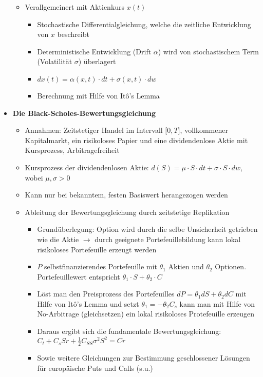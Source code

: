 \begin{itemize}
\begin{itemize}
		\item Verallgemeinert mit Aktienkurs \(x(t)\)
		\begin{itemize}
			\item Stochastische Differentialgleichung, welche die zeitliche Entwicklung von \(x\) beschreibt
			\item Deterministische Entwicklung (Drift \(\alpha\)) wird von stochastischem Term (Volatilität \(\sigma\)) überlagert
			\item \(dx(t) = \alpha(x,t)\cdot dt + \sigma(x,t)\cdot dw\)
			\item Berechnung mit Hilfe von Itô's Lemma
		\end{itemize}
	\end{itemize}
	\item \textbf{Die Black-Scholes-Bewertungsgleichung}
	\begin{itemize}
		\item Annahmen: Zeitstetiger Handel im Intervall \(\lbrack 0,T\rbrack\), vollkommener Kapitalmarkt, ein risikoloses Papier und eine dividendenlose Aktie mit Kursprozess, Arbitragefreiheit
		\item Kursprozess der dividendenlosen Aktie: \(d(S) = \mu \cdot S \cdot dt + \sigma \cdot S \cdot dw\), wobei \(\mu,\sigma > 0\)
		\item Kann nur bei bekanntem, festen Basiswert herangezogen werden
		\item Ableitung der Bewertungsgleichung durch zeitstetige Replikation
		\begin{itemize}
			\item Grundüberlegung: Option wird durch die selbe Unsicherheit getrieben wie die Aktie \(\rightarrow\) durch geeignete Portefeuillebildung kann lokal risikoloses Portefeuille erzeugt werden
			\item \(P\) selbstfinanzierendes Portefeuille mit \(\theta_1\) Aktien und \(\theta_2\) Optionen. Portefeuillewert entspricht \(\theta_1 \cdot S + \theta_2 \cdot C\)
			\item Löst man den Preisprozess des Portefeuilles \(dP = \theta_1dS + \theta_2dC\) mit Hilfe von Itô's Lemma und setzt \(\theta_1 = -\theta_2C_s\) kann man mit Hilfe von No-Arbitrage (gleichsetzen) ein lokal risikoloses Protefeuille erzeugen
			\item Daraus ergibt sich die fundamentale Bewertungsgleichung: \(C_t + C_sSr + \frac{1}{2}C_{SS}\sigma^2S^2 = Cr\)
			\item Sowie weitere Gleichungen zur Bestimmung geschlossener Lösungen für europäische Puts und Calls (s.u.)
		\end{itemize}
	\end{itemize}
\end{itemize}



